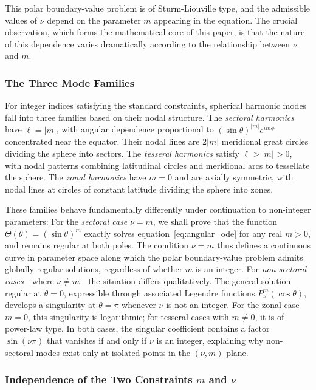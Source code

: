 \documentclass[
  aip,
  amsmath,amssymb,
  preprint
]{revtex4-1}
\begin{document}
This polar boundary-value problem is of Sturm-Liouville type, and the admissible values of $\nu$ depend on the parameter $m$ appearing in the equation. The crucial observation, which forms the mathematical core of this paper, is that the nature of this dependence varies dramatically according to the relationship between $\nu$ and $m$.

\subsubsection{The Three Mode Families}

For integer indices satisfying the standard constraints, spherical harmonic modes fall into three families based on their nodal structure. The \textit{sectoral harmonics} have $\ell = |m|$, with angular dependence proportional to $(\sin\theta)^{|m|} e^{im\phi}$ concentrated near the equator. Their nodal lines are $2|m|$ meridional great circles dividing the sphere into sectors. The \textit{tesseral harmonics} satisfy $\ell > |m| > 0$, with nodal patterns combining latitudinal circles and meridional arcs to tessellate the sphere. The \textit{zonal harmonics} have $m = 0$ and are axially symmetric, with nodal lines at circles of constant latitude dividing the sphere into zones.

These families behave fundamentally differently under continuation to non-integer parameters:
For the \textit{sectoral case} $\nu = m$, we shall prove that the function $\Theta(\theta) = (\sin\theta)^m$ exactly solves equation~\eqref{eq:angular_ode} for any real $m > 0$, and remains regular at both poles. The condition $\nu = m$ thus defines a continuous curve in parameter space along which the polar boundary-value problem admits globally regular solutions, regardless of whether $m$ is an integer.
For \textit{non-sectoral cases}---where $\nu \neq m$---the situation differs qualitatively. The general solution regular at $\theta = 0$, expressible through associated Legendre functions $P_\nu^m(\cos\theta)$, develops a singularity at $\theta = \pi$ whenever $\nu$ is not an integer. For the zonal case $m = 0$, this singularity is logarithmic; for tesseral cases with $m \neq 0$, it is of power-law type. In both cases, the singular coefficient contains a factor $\sin(\nu\pi)$ that vanishes if and only if $\nu$ is an integer, explaining why non-sectoral modes exist only at isolated points in the $(\nu, m)$ plane.

\subsubsection{Independence of the Two Constraints $m$ and $\nu$}
\end{document}
